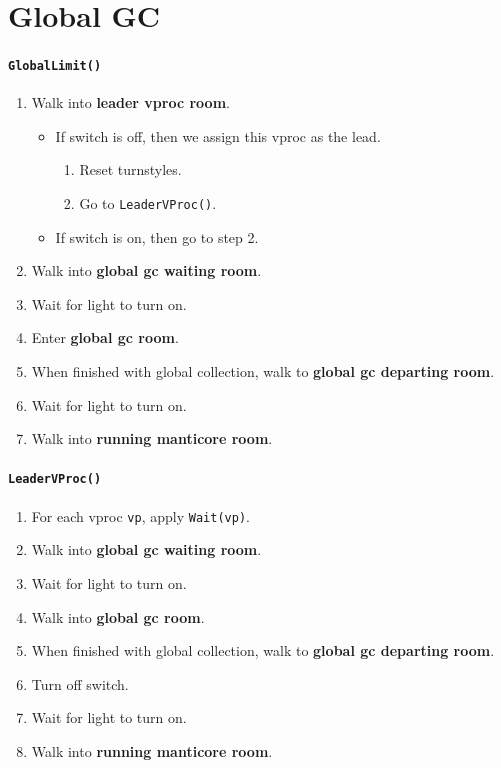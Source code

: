 \documentclass[11pt]{article}
\begin{document}
\section{Global GC}

\paragraph{\texttt{GlobalLimit()}}

\begin{enumerate}
  \item Walk into \textbf{leader vproc room}.
    \begin{itemize}
      \item If switch is off, then we assign this vproc as the lead.
        \begin{enumerate}
          \item Reset turnstyles.
          \item Go to \texttt{LeaderVProc()}.
        \end{enumerate}
      \item If switch is on, then go to step 2.
    \end{itemize}
  \item Walk into \textbf{global gc waiting room}.
  \item Wait for light to turn on.
  \item Enter \textbf{global gc room}.
  \item When finished with global collection, walk to \textbf{global gc departing room}.
  \item Wait for light to turn on.
  \item Walk into \textbf{running manticore room}.
\end{enumerate}

\paragraph{\texttt{LeaderVProc()}}

\begin{enumerate}
  \item For each vproc \texttt{vp}, apply \texttt{Wait(vp)}.
  \item Walk into \textbf{global gc waiting room}.
  \item Wait for light to turn on.
  \item Walk into \textbf{global gc room}.
  \item When finished with global collection, walk to \textbf{global gc departing room}.
  \item Turn off switch.
  \item Wait for light to turn on.
  \item Walk into \textbf{running manticore room}.
\end{enumerate}
\end{document}

